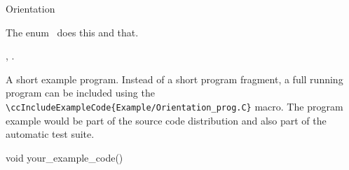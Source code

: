 

\begin{ccRefEnum}{Orientation}  %


\ccDefinition
  
The enum \ccRefName\ does this and that.



\ccIsModel


\ccSeeAlso

,
.

\ccExample

A short example program.
Instead of a short program fragment, a full running program can be
included using the 
\verb|\ccIncludeExampleCode{Example/Orientation_prog.C}| 
macro. The program example would be part of the source code distribution and
also part of the automatic test suite.

\begin{ccExampleCode}
void your_example_code() {
}
\end{ccExampleCode}


\end{ccRefEnum}


